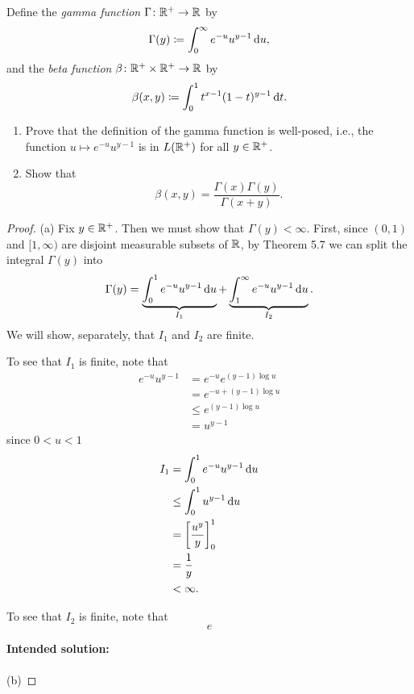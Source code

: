 \begin{problem}
Define the \emph{gamma function} $\Gamma\colon\mathbb{R}^+\to\mathbb{R}$ by
\[
\Gamma(y)\coloneqq\int_0^\infty e^{-u}u^{y-1}\mathop{}\!\mathrm{d} u,
\]
and the \emph{beta function} $\beta\colon\mathbb{R}^+\times\mathbb{R}^+\to\mathbb{R}$
by
\[
\beta(x,y)\coloneqq\int_0^1 t^{x-1}(1-t)^{y-1}\mathop{}\!\mathrm{d} t.
\]
\begin{enumerate}[label=(\alph*)]
\item Prove that the definition of the gamma function is well-posed, i.e.,
the function $u\mapsto e^{-u}u^{y-1}$ is in $L(\mathbb{R}^+)$ for all
$y\in\mathbb{R}^+$.
\item Show that
\[
\beta(x,y)=\frac{\Gamma(x)\Gamma(y)}{\Gamma(x+y)}.
\]
\end{enumerate}
\end{problem}
\begin{proof}
(a) Fix $y\in\mathbb{R}^+$. Then we must show that $\Gamma(y)<\infty$. First,
since $(0,1)$ and $[1,\infty)$ are disjoint measurable subsets of $\mathbb{R}$,
by Theorem 5.7 we can split the integral $\Gamma(y)$ into
\begin{equation}
\label{eq:split-integral-5}
\Gamma(y)=\underbrace{\int_0^1 e^{-u}u^{y-1}\mathop{}\!\mathrm{d} u}_{I_1}
+\underbrace{\int_1^\infty e^{-u}u^{y-1}\mathop{}\!\mathrm{d} u}_{I_2}.
\end{equation}
We will show, separately, that $I_1$ and $I_2$ are finite.

To see that $I_1$ is finite, note that
\begin{equation}
\label{eq:estimate-1-5}
\begin{aligned}
e^{-u}u^{y-1}&=e^{-u}e^{(y-1)\log u}\\
&=e^{-u+(y-1)\log u}\\
&\leq e^{(y-1)\log u}\\
&=u^{y-1}
\end{aligned}
\end{equation}
since $0<u<1$
\begin{equation}
\label{eq:estimate-i-1-5}
\begin{aligned}
I_1&=\int_0^1 e^{-u}u^{y-1}\mathop{}\!\mathrm{d} u\\
&\leq\int_0^1 u^{y-1}\mathop{}\!\mathrm{d} u\\
&=\left[\frac{u^y}{y}\right]_0^1\\
&=\frac{1}{y}\\
&<\infty.
\end{aligned}
\end{equation}

To see that $I_2$ is finite, note that
\begin{equation}
\label{eq:estimate-2-5}
e
\end{equation}

\textbf{Intended solution:}
\\\\
(b)
\end{proof}

